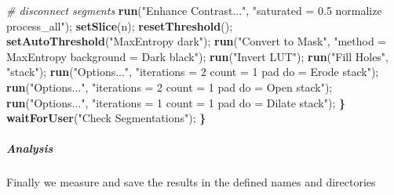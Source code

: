 \documentclass[11pt,singlespacinge,twoside]{reedthesis} %
\newenvironment{Shaded}{}{}
\newcommand{\CommentTok}[1]{\textit{#1}}
\newcommand{\ErrorTok}[1]{\textbf{#1}}
\newcommand{\KeywordTok}[1]{\textbf{#1}}
\newcommand{\NormalTok}[1]{#1}
\newcommand{\StringTok}[1]{#1}
\theoremstyle{definition}
\theoremstyle{definition}
\theoremstyle{definition}
\theoremstyle{remark}
\begin{document}
\begin{Shaded}
\begin{Highlighting}[numbers=left,,]
    \CommentTok{#   disconnect segments}
        \KeywordTok{run}\NormalTok{(}\StringTok{"Enhance Contrast..."}\NormalTok{,}
            \StringTok{"saturated = 0.5 normalize process_all"}\NormalTok{);}
        \KeywordTok{setSlice}\NormalTok{(n);}
        \KeywordTok{resetThreshold}\NormalTok{();}
        \KeywordTok{setAutoThreshold}\NormalTok{(}\StringTok{"MaxEntropy dark"}\NormalTok{);}
        \KeywordTok{run}\NormalTok{(}\StringTok{"Convert to Mask"}\NormalTok{,}
            \StringTok{"method = MaxEntropy background = Dark black"}\NormalTok{);}
        \KeywordTok{run}\NormalTok{(}\StringTok{"Invert LUT"}\NormalTok{);}
        \KeywordTok{run}\NormalTok{(}\StringTok{"Fill Holes"}\NormalTok{, }\StringTok{"stack"}\NormalTok{);}
        \KeywordTok{run}\NormalTok{(}\StringTok{"Options..."}\NormalTok{, }
            \StringTok{"iterations = 2 count = 1 pad do = Erode stack"}\NormalTok{);}
        \KeywordTok{run}\NormalTok{(}\StringTok{"Options..."}\NormalTok{, }
            \StringTok{"iterations = 2 count = 1 pad do = Open stack"}\NormalTok{);}
        \KeywordTok{run}\NormalTok{(}\StringTok{"Options..."}\NormalTok{, }
            \StringTok{"iterations = 1 count = 1 pad do = Dilate stack"}\NormalTok{);}
    \ErrorTok{\}}
    \KeywordTok{waitForUser}\NormalTok{(}\StringTok{"Check Segmentations"}\NormalTok{);}
    \ErrorTok{\}}
\end{Highlighting}
\end{Shaded}
\normalsize

\hypertarget{analysis}{%
\subparagraph{Analysis}\label{analysis}}

Finally we measure and save the results in the defined names and directories
\end{document}
